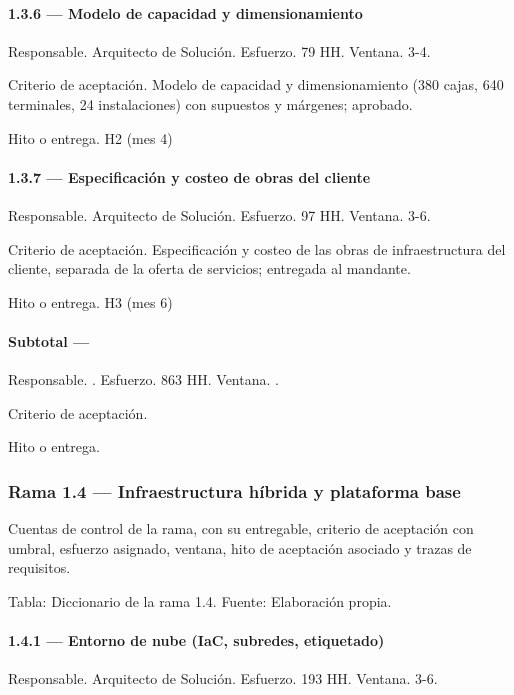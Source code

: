\documentclass[11pt]{article}
\begin{document}
\paragraph{1.3.6 — Modelo de capacidad y dimensionamiento}

Responsable. Arquitecto de Solución. Esfuerzo. 79 HH. Ventana. 3-4.

Criterio de aceptación. Modelo de capacidad y dimensionamiento (380 cajas, 640 terminales, 24 instalaciones) con supuestos y márgenes; aprobado.

Hito o entrega. H2 (mes 4)

\paragraph{1.3.7 — Especificación y costeo de obras del cliente}

Responsable. Arquitecto de Solución. Esfuerzo. 97 HH. Ventana. 3-6.

Criterio de aceptación. Especificación y costeo de las obras de infraestructura del cliente, separada de la oferta de servicios; entregada al mandante.

Hito o entrega. H3 (mes 6)

\paragraph{Subtotal — }

Responsable. . Esfuerzo. 863 HH. Ventana. .

Criterio de aceptación.

Hito o entrega.

\subsubsection{Rama 1.4 — Infraestructura híbrida y plataforma base}

Cuentas de control de la rama, con su entregable, criterio de aceptación con umbral, esfuerzo asignado, ventana, hito de aceptación asociado y trazas de requisitos.

Tabla: Diccionario de la rama 1.4. Fuente: Elaboración propia.

\paragraph{1.4.1 — Entorno de nube (IaC, subredes, etiquetado)}

Responsable. Arquitecto de Solución. Esfuerzo. 193 HH. Ventana. 3-6.
\end{document}
